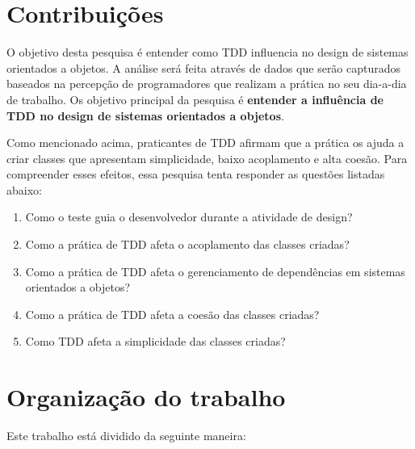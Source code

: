 \section{Contribuições}

O objetivo desta pesquisa é entender como TDD influencia no design de sistemas
orientados a objetos. A análise será feita através de dados que serão
capturados baseados na percepção de programadores que realizam a prática no seu
dia-a-dia de trabalho.
Os objetivo principal da pesquisa é \textbf{entender a influência de TDD no
design de sistemas orientados a objetos}.

Como mencionado acima, praticantes de TDD afirmam que a prática os ajuda a criar
classes que apresentam simplicidade, baixo acoplamento e alta coesão. Para
compreender esses efeitos, essa pesquisa tenta responder as questões listadas
abaixo:

\begin{enumerate}

  \item Como o teste guia o desenvolvedor durante a atividade de
  design?

  \item Como a prática de TDD afeta o acoplamento das classes criadas?

  \item Como a prática de TDD afeta o gerenciamento de dependências em sistemas
  orientados a objetos?

  \item Como a prática de TDD afeta a coesão das classes criadas?

  \item Como TDD afeta a simplicidade das classes criadas?

\end{enumerate}

\section{Organização do trabalho}

Este trabalho está dividido da seguinte maneira: 

